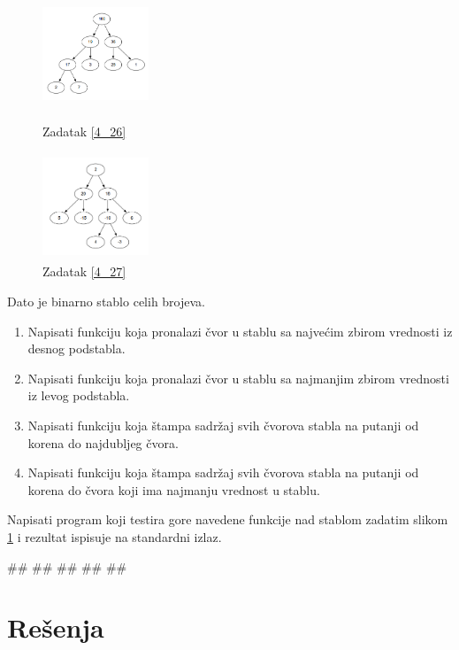 \begin{Answer}[ref=4_26]
\\
\end{Answer}

\begin{figure}[!htb]

\includegraphics[height=120px,width=120px]{poglavlja/slike/heap.png}
\caption{Zadatak \ref{4_26}}
\label{fig:zadatak426}
\endminipage\hfill
{}
\includegraphics[height=120px,width=120px]{poglavlja/slike/binarna_stabla.png}
\caption{Zadatak \ref{4_27}}
\label{fig:zadatak427}
\endminipage\hfill

\end{figure}

\begin{Exercise}[label=4_27]
Dato je binarno stablo celih brojeva.
\begin{enumerate}
\item Napisati funkciju koja pronalazi čvor u stablu sa najvećim zbirom vrednosti iz desnog podstabla.
\item Napisati funkciju koja pronalazi čvor u stablu sa najmanjim zbirom vrednosti iz levog podstabla.
\item Napisati funkciju koja štampa sadržaj svih čvorova stabla na putanji od korena do najdubljeg čvora.
\item Napisati funkciju koja štampa sadržaj svih čvorova stabla na putanji od korena do čvora koji ima najmanju vrednost u stablu.
\end{enumerate}
Napisati program koji testira gore navedene funkcije nad stablom zadatim slikom \ref{fig:zadatak427} i rezultat ispisuje na standardni izlaz.  

\begin{maxitest}
\begin{test}{1}
#\naslovIzlaz#
##
##
##
##
\end{test}
\end{maxitest}

\end{Exercise}


\section{Rešenja}
\shipoutAnswer
